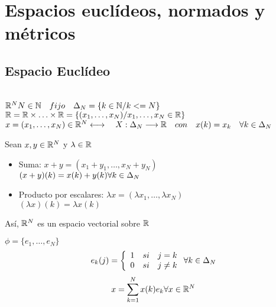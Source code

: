 \chapter{Espacios euclídeos, normados y métricos}
\section{Espacio Euclídeo}
    \begin{definicion} \\ 

    \noindent
        $\mathbb R^N \\ N \in \mathbb N\quad fijo \quad \Delta_N = \{k \in \mathbb N / k <= N\}$ \newline
        $\mathbb R = \mathbb R \times \ldots \times \mathbb R = \{ (x_1, \ldots, x_N) / x_1, \ldots , x_N \in \mathbb R\} $\newline
        $x = (x_1, \ldots , x_N) \in \mathbb R^N \\ \longleftrightarrow \quad X : \Delta_N \longrightarrow \mathbb R \quad con \quad x(k) = x_k \quad \forall k \in \Delta_N$
    \end{definicion}
    \begin{definicion}
        Sean $x, y \in \mathbb R^N$ y  $\lambda \in \mathbb R$
        \begin{itemize}
            \item Suma:
            $ x + y = (x_1+y_1, \ldots, x_N + y_N)$ \\
            $ (x+y)(k) = x(k) + y(k) \\ \forall k \in \Delta_N$
            \item Producto por escalares:
            $\lambda x = (\lambda x_1, \ldots , \lambda x_N)$ \\
            $(\lambda x)(k) =  \lambda x(k)$
        \end{itemize}
    \end{definicion}
    Así, $\mathbb R^N$ es un espacio vectorial sobre $\mathbb R$

    
    \begin{definicion}
        $\phi = \{ e_1, \ldots , e_N\}$ 
        $$e_k(j) = \left\{ \begin{array}{lll}
            1 & si & j=k\\
            0 & si & j\neq k\\
        \end{array} \right. \\ \forall k \in \Delta_N$$
        $$x = \sum_{k=1}^N x(k)e_k \\ \forall x \in \mathbb R^N$$
    \end{definicion}
        
